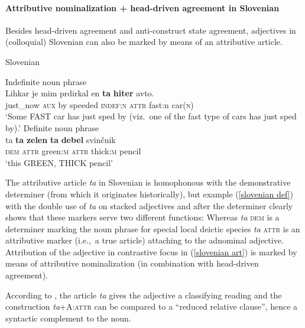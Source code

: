 \paragraph*{Attributive nominalization + head\hyp{}driven agreement in Slovenian}
Besides head\hyp{}driven agreement and anti\hyp{}construct state agreement, adjectives in (colloquial) Slovenian can also be marked by means of an attributive article.
\begin{exe}
\label{slovenian art}
\ex \rm{Slovenian \citep{marusic-etal2007}}
\begin{xlist}
\ex \rm{Indefinite noun phrase}\\
\gll	Lihkar je mim prdirkal en \textbf{ta} \textbf{hiter} avto.\\
	just\_now \textsc{aux} by speeded \textsc{indef:n} \textsc{attr} fast:n car(\textsc{n})\\
\glt	‘Some FAST car has just sped by (viz.~one of the fast type of cars has just sped by).’ 
\label{slovenian def}
\ex \rm{Definite noun phrase}\\
\gll 	ta \textbf{ta} \textbf{zelen} \textbf{ta} \textbf{debel} svin\v{c}nik\\
	\textsc{dem} \textsc{attr} green\textsc{:m} \textsc{attr} thick\textsc{:m} pencil\\
\glt 	‘this GREEN, THICK pencil’
\end{xlist}
\end{exe}
The attributive article \textit{ta} in Slovenian is homophonous with the demonstrative determiner (from which it originates historically), but example (\ref{slovenian def}) with the double use of \textit{ta} on stacked adjectives and after the determiner clearly shows that these markers serve two different functions: Whereas \textit{ta} \textsc{dem} is a determiner marking the noun phrase for special local deictic species \textit{ta} \textsc{attr} is an attributive marker (i.e.,~a true article) attaching to the adnominal adjective. Attribution of the adjective in contrastive focus in (\ref{slovenian art}) is marked by means of attributive nominalization (in combination with head\hyp{}driven agreement).

According to \cite{marusic-etal2007,marusic-etal2007b}, the article \textit{ta} gives the adjective a classifying reading and the construction \textit{ta}+A:\textsc{attr} can be compared to a “reduced relative clause”, hence a syntactic complement to the noun.

